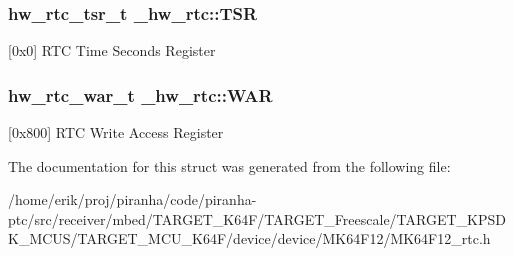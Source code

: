 \subsubsection[{\texorpdfstring{T\+SR}{TSR}}]{ {\bf hw\+\_\+rtc\+\_\+tsr\+\_\+t} \+\_\+hw\+\_\+rtc\+::\+T\+SR}\hypertarget{struct__hw__rtc_a627152ef88639bb85bd0dce2369dce0c}{}\label{struct__hw__rtc_a627152ef88639bb85bd0dce2369dce0c}
\mbox{[}0x0\mbox{]} R\+TC Time Seconds Register 
\subsubsection[{\texorpdfstring{W\+AR}{WAR}}]{ {\bf hw\+\_\+rtc\+\_\+war\+\_\+t} \+\_\+hw\+\_\+rtc\+::\+W\+AR}\hypertarget{struct__hw__rtc_a2aa4d85ac8b5b0f1821131e6c442b876}{}\label{struct__hw__rtc_a2aa4d85ac8b5b0f1821131e6c442b876}
\mbox{[}0x800\mbox{]} R\+TC Write Access Register 

The documentation for this struct was generated from the following file\+:\begin{DoxyCompactItemize}
\item 
/home/erik/proj/piranha/code/piranha-\/ptc/src/receiver/mbed/\+T\+A\+R\+G\+E\+T\+\_\+\+K64\+F/\+T\+A\+R\+G\+E\+T\+\_\+\+Freescale/\+T\+A\+R\+G\+E\+T\+\_\+\+K\+P\+S\+D\+K\+\_\+\+M\+C\+U\+S/\+T\+A\+R\+G\+E\+T\+\_\+\+M\+C\+U\+\_\+\+K64\+F/device/device/\+M\+K64\+F12/M\+K64\+F12\+\_\+rtc.\+h\end{DoxyCompactItemize}
